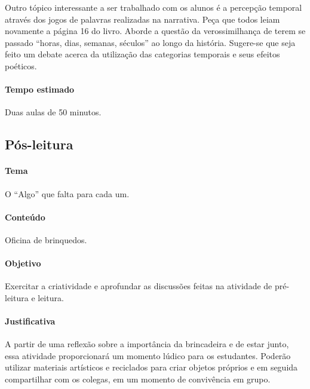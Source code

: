 \documentclass[11pt]{extarticle}
\begin{document}


Outro tópico interessante a ser trabalhado com os alunos é a percepção temporal através dos jogos de palavras realizadas na narrativa. Peça que todos leiam novamente a página 16 do livro. Aborde a questão da verossimilhança de terem se passado ``horas, dias, semanas, séculos'' ao longo da história. Sugere-se que seja feito um debate acerca da utilização das categorias temporais e seus efeitos poéticos.


\paragraph{Tempo estimado} Duas aulas de 50 minutos.

\subsection{Pós-leitura}


\paragraph{Tema} O ``Algo'' que falta para cada um.

\paragraph{Conteúdo} Oficina de brinquedos.

\paragraph{Objetivo} Exercitar a criatividade e aprofundar as discussões feitas na atividade de pré-leitura e leitura.

\paragraph{Justificativa} A partir de uma reflexão sobre a importância da brincadeira e de estar junto, essa atividade proporcionará um momento lúdico para os estudantes. Poderão utilizar materiais artísticos e reciclados para criar objetos próprios e em seguida compartilhar com os colegas, em um momento de convivência em grupo.
\end{document}
